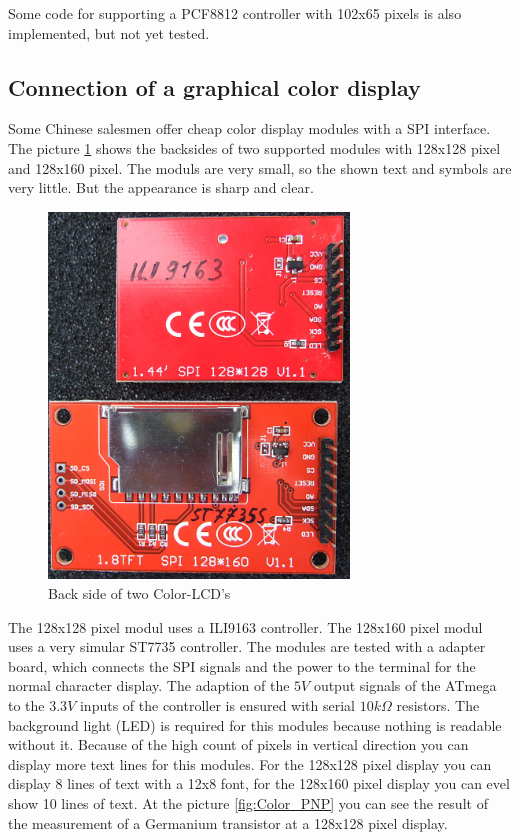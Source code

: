 Some code for supporting a PCF8812 controller with 102x65 pixels is also implemented,
but not yet tested.

\subsection{Connection of a graphical color display}

Some Chinese salesmen offer cheap color display modules with a SPI interface.
The picture \ref{fig:Color_both} shows the backsides of two supported modules with 128x128 pixel
and 128x160 pixel. 
The moduls are very small, so the shown text and symbols are very little.
But the appearance is sharp and clear.

\begin{figure}[H]
\centering
\includegraphics[width=8cm]{../PNG/Color_ILI9163_ST7735.jpg}
\caption{Back side of two Color-LCD's}
\label{fig:Color_both}
\end{figure}

The 128x128 pixel modul uses a ILI9163 controller.
The 128x160 pixel modul uses a very simular ST7735 controller.
The modules are tested with a adapter board, which connects the
SPI signals and the power to the terminal for the normal character display.
The adaption of the \(5V\) output signals of the ATmega to the \(3.3V\) inputs of the controller
is ensured with serial \(10k\Omega\) resistors.
The background light (LED) is required for this modules because nothing is readable without it.
Because of the high count of pixels in vertical direction you can display more text lines for this modules.
For the 128x128 pixel display you can display 8 lines of text with a 12x8 font,
for the 128x160 pixel display you can evel show 10 lines of text.
At the picture \ref{fig:Color_PNP} you can see the result of the measurement of a Germanium transistor
at a 128x128 pixel display.

